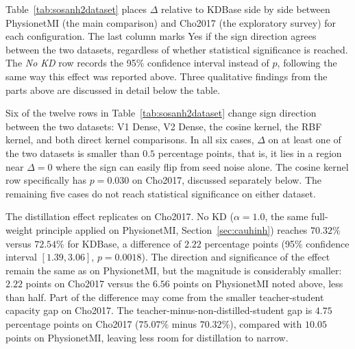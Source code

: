 Table~\ref{tab:sosanh2dataset} places $\Delta$ relative to KDBase
side by side between PhysionetMI (the main comparison) and Cho2017
(the exploratory survey) for each configuration. The last column
marks Yes if the sign direction agrees between the two datasets,
regardless of whether statistical significance is reached. The
\emph{No KD} row records the 95\% confidence interval instead of
$p$, following the same way this effect was reported above. Three
qualitative findings from the parts above are discussed in detail
below the table.

Six of the twelve rows in Table~\ref{tab:sosanh2dataset} change sign
direction between the two datasets: V1 Dense, V2 Dense, the cosine
kernel, the RBF kernel, and both direct kernel comparisons. In all
six cases, $\Delta$ on at least one of the two datasets is smaller
than $0.5$ percentage points, that is, it lies in a region near
$\Delta = 0$ where the sign can easily flip from seed noise alone.
The cosine kernel row specifically has $p = 0.030$ on Cho2017,
discussed separately below. The remaining five cases do not reach
statistical significance on either dataset.

The distillation effect replicates on Cho2017. No KD ($\alpha = 1.0$,
the same full-weight principle applied on PhysionetMI,
Section~\ref{sec:cauhinh}) reaches $70.32\%$ versus $72.54\%$ for
KDBase, a difference of $2.22$ percentage points (95\% confidence
interval $[1.39, 3.06]$, $p = 0.0018$). The direction and
significance of the effect remain the same as on PhysionetMI, but
the magnitude is considerably smaller: $2.22$ points on Cho2017
versus the $6.56$ points on PhysionetMI noted above, less than half.
Part of the difference may come from the smaller teacher-student
capacity gap on Cho2017. The teacher-minus-non-distilled-student gap
is $4.75$ percentage points on Cho2017 ($75.07\%$ minus $70.32\%$),
compared with $10.05$ points on PhysionetMI, leaving less room for
distillation to narrow.

